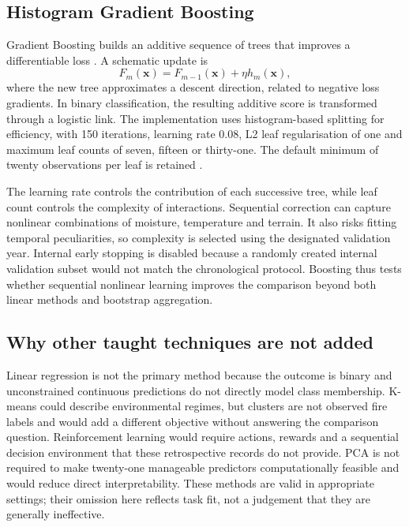 \documentclass[conference,a4paper]{IEEEtran}
\begin{document}
\subsection{Histogram Gradient Boosting}
Gradient Boosting builds an additive sequence of trees that improves a differentiable loss \citep{friedman}. A schematic update is
\begin{equation}
F_m(\mathbf x)=F_{m-1}(\mathbf x)+\eta h_m(\mathbf x),
\end{equation}
where the new tree approximates a descent direction, related to negative loss gradients. In binary classification, the resulting additive score is transformed through a logistic link. The implementation uses histogram-based splitting for efficiency, with 150 iterations, learning rate 0.08, L2 leaf regularisation of one and maximum leaf counts of seven, fifteen or thirty-one. The default minimum of twenty observations per leaf is retained \citep{sklearnboost}.

The learning rate controls the contribution of each successive tree, while leaf count controls the complexity of interactions. Sequential correction can capture nonlinear combinations of moisture, temperature and terrain. It also risks fitting temporal peculiarities, so complexity is selected using the designated validation year. Internal early stopping is disabled because a randomly created internal validation subset would not match the chronological protocol. Boosting thus tests whether sequential nonlinear learning improves the comparison beyond both linear methods and bootstrap aggregation.

\subsection{Why other taught techniques are not added}
Linear regression is not the primary method because the outcome is binary and unconstrained continuous predictions do not directly model class membership. K-means could describe environmental regimes, but clusters are not observed fire labels and would add a different objective without answering the comparison question. Reinforcement learning would require actions, rewards and a sequential decision environment that these retrospective records do not provide. PCA is not required to make twenty-one manageable predictors computationally feasible and would reduce direct interpretability. These methods are valid in appropriate settings; their omission here reflects task fit, not a judgement that they are generally ineffective.
\end{document}
